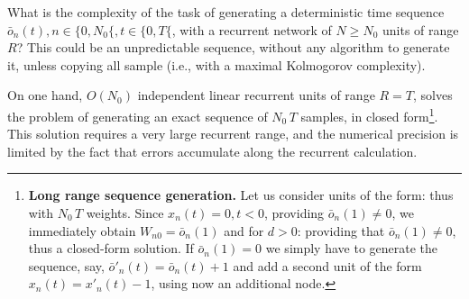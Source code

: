 What is the complexity of the task of generating a deterministic time sequence $\bar{o}_n(t), n \in \{0, N_0\{, t \in \{0, T\{$, with a recurrent network of $N \ge N_0$ units of range $R$? This could be an unpredictable sequence, without any algorithm to generate it, unless copying all sample (i.e., with a maximal Kolmogorov complexity).

On one hand, $O(N_0)$ independent linear recurrent units of range $R=T$, solves the problem of generating an exact sequence of $N_0 \, T$ samples, in closed form\footnote{{\bf Long range sequence generation.} Let us consider units of the form:
thus with $N_0 \, T$ weights. Since $x_n(t) = 0, t < 0$, providing $\bar{o}_n(1) \neq 0$, we immediately obtain $W_{n0} = \bar{o}_n(1)$ and for $d > 0$: 
providing that $\bar{o}_n(1) \neq 0$, thus a closed-form solution. If $\bar{o}_n(1) = 0$ we simply have to generate the sequence, say, $\bar{o}'_n(t) = \bar{o}_n(t) + 1$ and add a second unit of the form $x_n(t) = x'_n(t) - 1$, using now an additional node.
\hr}. This solution requires a very large recurrent range, and the numerical precision is limited by the fact that errors accumulate along the recurrent calculation.

